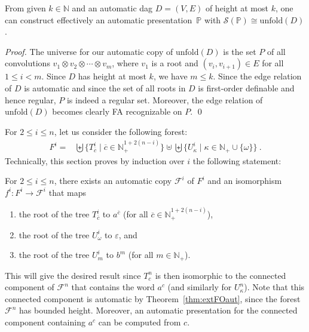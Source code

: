\documentclass[envcountsame]{llncs}
\newcommand{\unfold}{\mathrm{unfold}}
\newcommand{\N}{\mathbb N}
\renewcommand{\P}{{\mathbb P}}
\renewcommand{\S}{\mathcal S}
\begin{document}
\begin{lemma}\label{from dags to trees}
  From given $k \in \N$ and an automatic dag $D = (V,E)$ of height at
  most $k$, one can construct effectively an automatic
  presentation~$\P$ with $\S(\P)\cong\unfold(D)$.
\end{lemma}

\begin{proof}
  The universe for our automatic copy of $\unfold(D)$ is the
  set $P$ of all convolutions $v_1 \otimes v_2 \otimes \cdots \otimes
  v_m$, where $v_1$ is a root and $(v_i, v_{i+1}) \in E$ for all $1
  \leq i < m$. Since $D$ has height at most $k$, we have $m \leq k$.
  Since the edge relation of $D$ is automatic and since the set of all
  roots in $D$ is first-order definable and hence regular, $P$ is
  indeed a regular set.  Moreover, the edge relation of $\unfold(D)$
  becomes clearly FA recognizable on $P$.  \qed
\end{proof}
For $2\le i\le n$, let us consider the following forest:
\begin{align*}
  F^i =
    & \biguplus \{T^i_{\overline c}\mid \overline c\in\N_+^{1+2(n-i)}\}
     \uplus \biguplus \{U^i_\kappa \mid \kappa\in\N_+ \cup \{\omega\}\}\ .
\end{align*}
Technically, this section proves by induction over $i$ the following
statement:
\begin{proposition}\label{P:forest-automatic}
  For $2\le i\le n$, there exists an automatic copy $\mathcal F^i$ of
  $F^i$ and an isomorphism $f^i:F^i\to \mathcal F^i$ that maps
  \begin{enumerate}
  \item the root of the tree $T^i_{\overline c}$ to $a^{\overline c}$
    (for all $\overline c\in\N_+^{1+2(n-i)}$),
  \item the root of the tree $U^i_\omega$ to $\varepsilon$, and
  \item the root of the tree $U^i_m$ to $b^m$ (for all
    $m\in\N_+$).
  \end{enumerate}
\end{proposition}
This will give the desired result since $T^n_c$ is then
isomorphic to the connected component of $\mathcal F^n$ that contains
the word $a^c$ (and similarly for $U^n_\kappa$).  Note
that this connected component is automatic by
Theorem~\ref{thm:extFOaut}, since the forest $\mathcal F^n$ has
bounded height. Moreover, an automatic presentation for 
the connected component containing $a^c$ can be computed from $c$.
\end{document}
